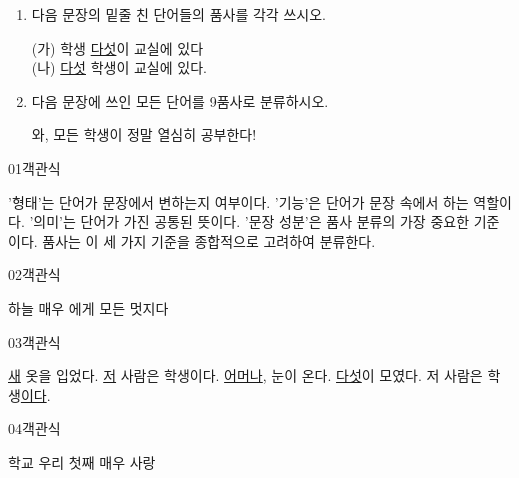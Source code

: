 \documentclass[fs9,seriesRus]{korfarm-base}
\begin{document}
\begin{enumerate}[leftmargin=22pt, itemsep=6pt, topsep=4pt, label=\textbf{\arabic*.}]
\begin{kfEvidence}
(나) \uline{저기}에 우리 집이 있다.\end{kfEvidence}
\item 다음 문장의 밑줄 친 단어들의 품사를 각각 쓰시오.
\begin{kfEvidence}(가) 학생 \uline{다섯}이 교실에 있다 \\\relax
(나) \uline{다섯} 학생이 교실에 있다.\end{kfEvidence}
\item 다음 문장에 쓰인 모든 단어를 9품사로 분류하시오.
\begin{kfEvidence}와, 모든 학생이 정말 열심히 공부한다!\end{kfEvidence}
\end{enumerate}


\par\medskip
\kfBeginMC
\begin{kfQBlock}{01}{객관식}
\begin{kfChoices}
\kfChoice '형태'는 단어가 문장에서 변하는지 여부이다.
\kfChoice '기능'은 단어가 문장 속에서 하는 역할이다.
\kfChoice '의미'는 단어가 가진 공통된 뜻이다.
\kfChoice '문장 성분'은 품사 분류의 가장 중요한 기준이다.
\kfChoice 품사는 이 세 가지 기준을 종합적으로 고려하여 분류한다.
\end{kfChoices}
\end{kfQBlock}
\begin{kfQBlock}{02}{객관식}
\begin{kfChoices}
\kfChoice 하늘
\kfChoice 매우
\kfChoice 에게
\kfChoice 모든
\kfChoice 멋지다
\end{kfChoices}
\end{kfQBlock}
\begin{kfQBlock}{03}{객관식}
\begin{kfChoices}
\kfChoice \uline{새} 옷을 입었다.
\kfChoice \uline{저} 사람은 학생이다.
\kfChoice \uline{어머나}, 눈이 온다.
\kfChoice \uline{다섯}이 모였다.
\kfChoice 저 사람은 학생\uline{이다}.
\end{kfChoices}
\end{kfQBlock}
\begin{kfQBlock}{04}{객관식}
\begin{kfChoices}
\kfChoice 학교
\kfChoice 우리
\kfChoice 첫째
\kfChoice 매우
\kfChoice 사랑
\end{kfChoices}
\end{kfQBlock}
\end{document}
